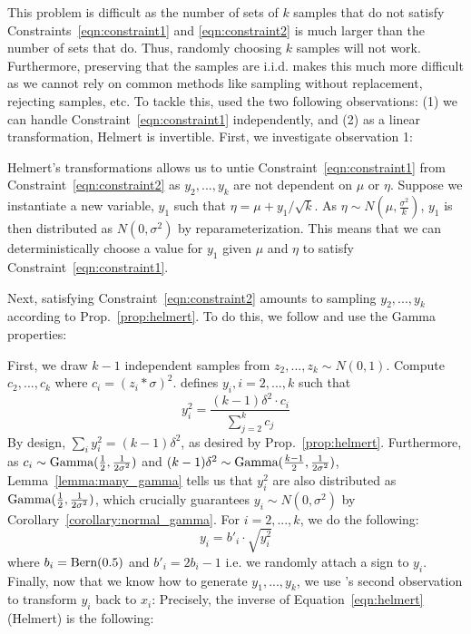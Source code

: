 

This problem is difficult as the number of sets of $k$ samples that do not satisfy Constraints~\ref{eqn:constraint1} and \ref{eqn:constraint2} is much larger than the number of sets that do. Thus, randomly choosing $k$ samples will not work. Furthermore, preserving that the samples are i.i.d. makes this much more difficult as we cannot rely on common methods like sampling without replacement, rejecting samples, etc.
To tackle this, \cite{pullin1979generation} used the two following observations: (1) we can handle Constraint~\ref{eqn:constraint1} independently, and (2) as a linear transformation, Helmert is invertible. First, we investigate observation 1:

Helmert's transformations allows us to untie Constraint~\ref{eqn:constraint1} from Constraint~\ref{eqn:constraint2} as $y_2, ..., y_k$ are not dependent on $\mu$ or $\eta$. Suppose we instantiate a new variable, $y_1$ \cite{kendall1946advanced} such that $\eta = \mu + y_1 / \sqrt{k}$.
As $\eta \sim N(\mu, \frac{\sigma^2}{k})$, $y_1$ is then distributed as $N(0, \sigma^2)$ by reparameterization. This means that we can deterministically choose a value for $y_1$ given $\mu$ and $\eta$ to satisfy Constraint~\ref{eqn:constraint1}.

Next, satisfying Constraint~\ref{eqn:constraint2} amounts to sampling $y_2, ..., y_k$ according to Prop.~\ref{prop:helmert}.
To do this, we follow \cite{cheng1984generation} and use the Gamma properties:

First, we draw $k - 1$ independent samples from $z_2, ..., z_k \sim N(0, 1)$. Compute $c_2, ..., c_k$ where $c_i = (z_i * \sigma)^2$. \cite{cheng1984generation} defines $y_i, i=2, ..., k$ such that
\begin{equation}
    y_i^2 = \frac{(k - 1)\delta^2 \cdot c_i}{\sum_{j=2}^{k} c_j}
\end{equation}
By design, $\sum_i y_i^2 = (k-1)\delta^2$, as desired by Prop.~\ref{prop:helmert}. Furthermore, as $c_i \sim \textup{Gamma}(\frac{1}{2}, \frac{1}{2\sigma^2})$ and $(k-1)\delta^2 \sim \textup{Gamma}(\frac{k-1}{2}, \frac{1}{2\sigma^2})$, Lemma~\ref{lemma:many_gamma} tells us that $y_i^2$ are also distributed as $\textup{Gamma}(\frac{1}{2}, \frac{1}{2\sigma^2})$, which crucially guarantees $y_i \sim N(0, \sigma^2)$ by Corollary~\ref{corollary:normal_gamma}. For $i = 2, ..., k$, we do the following:
\begin{equation}
    y_i = b'_i \cdot \sqrt{y_i^2}
\end{equation}
where $b_i = \textup{Bern}(0.5)$ and $b'_i = 2b_i- 1$ i.e. we randomly attach a sign to $y_i$. Finally, now that we know how to generate $y_1, ..., y_k$, we use \cite{pullin1979generation}'s second observation to transform $y_i$ back to $x_i$:
Precisely, the inverse of Equation~\ref{eqn:helmert} (Helmert) is the following:

